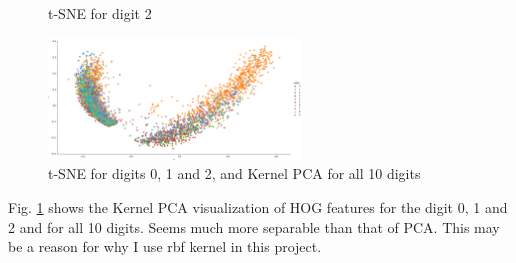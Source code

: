 \documentclass{article}
\begin{document}
\begin{figure}[H]
\begin{minipage}{0.32\textwidth}
        t-SNE for digit 2
    \end{minipage}
    \includegraphics[width=0.6\textwidth]{fig/pca/kernelpca.png}
    \caption{t-SNE for digits 0, 1 and 2, and Kernel PCA for all 10 digits}
    \label{kpca012}
\end{figure}
Fig. \ref{kpca012} shows the Kernel PCA visualization of HOG features for the digit 0, 1 and 2 and for all 10 digits. Seems much more separable than that of PCA. This may be a reason for why I use rbf kernel in this project.
\end{document}
